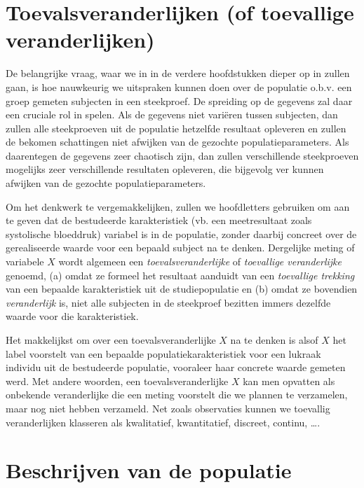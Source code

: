 \documentclass[
  12pt,dutch,coursenotes]{book}
\theoremstyle{definition}
\theoremstyle{definition}
\theoremstyle{definition}
\theoremstyle{remark}
\begin{document}
\hypertarget{toevalsveranderlijken-of-toevallige-veranderlijken}{%
\section{Toevalsveranderlijken (of toevallige veranderlijken)}\label{toevalsveranderlijken-of-toevallige-veranderlijken}}

De belangrijke vraag, waar we in in de verdere hoofdstukken dieper op in
zullen gaan, is hoe nauwkeurig we uitspraken kunnen doen over de populatie o.b.v. een groep gemeten subjecten in een steekproef.
De spreiding op de gegevens zal daar een cruciale rol in spelen.
Als de gegevens niet variëren tussen subjecten, dan zullen alle steekproeven uit de populatie hetzelfde resultaat opleveren en zullen de bekomen schattingen niet afwijken van de gezochte populatieparameters.
Als daarentegen de gegevens zeer chaotisch zijn, dan zullen verschillende steekproeven mogelijks zeer verschillende resultaten opleveren, die bijgevolg ver kunnen afwijken van de gezochte populatieparameters.

Om het denkwerk te vergemakkelijken, zullen we hoofdletters gebruiken om aan te geven dat
de bestudeerde karakteristiek (vb. een meetresultaat zoals systolische bloeddruk) variabel is in de populatie,
zonder daarbij concreet over de gerealiseerde waarde
voor een bepaald subject na te denken.
Dergelijke meting of variabele \(X\) wordt
algemeen een \emph{toevalsveranderlijke} of \emph{toevallige veranderlijke} genoemd, (a) omdat ze formeel het
resultaat aanduidt van een \emph{toevallige trekking} van een bepaalde
karakteristiek uit de studiepopulatie en (b) omdat ze bovendien \emph{veranderlijk} is,
niet alle subjecten in de steekproef bezitten immers dezelfde waarde
voor die karakteristiek.

Het makkelijkst om over een toevalsveranderlijke \(X\) na te denken is alsof \(X\) het label voorstelt van
een bepaalde populatiekarakteristiek voor een lukraak individu uit de
bestudeerde populatie, vooraleer haar concrete waarde gemeten werd.
Met andere woorden, een toevalsveranderlijke \(X\) kan men opvatten als onbekende veranderlijke die een meting voorstelt die we plannen te verzamelen, maar nog niet hebben verzameld.
Net zoals observaties kunnen we toevallig veranderlijken klasseren als kwalitatief, kwantitatief, discreet, continu, \ldots.

\hypertarget{beschrijven-van-de-populatie}{%
\section{Beschrijven van de populatie}\label{beschrijven-van-de-populatie}}
\end{document}
